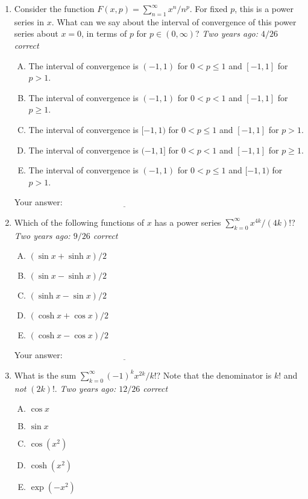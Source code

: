 \documentclass[10pt]{amsart}
\begin{document}
\begin{enumerate}
\item Consider the function $F(x,p) = \sum_{n=1}^\infty x^n/n^p$. For
  fixed $p$, this is a power series in $x$. What can we say about the
  interval of convergence of this power series about $x = 0$, in terms
  of $p$ for $p \in (0,\infty)$? {\em Two years ago: $4/26$ correct}
  \begin{enumerate}[(A)]
  \item The interval of convergence is $(-1,1)$ for $0 < p \le 1$ and
    $[-1,1]$ for $p > 1$.
  \item The interval of convergence is $(-1,1)$ for $0 < p < 1$ and
    $[-1,1]$ for $p \ge 1$.
  \item The interval of convergence is $[-1,1)$ for $0 < p \le 1$ and
    $[-1,1]$ for $p > 1$.
  \item The interval of convergence is $(-1,1]$ for $0 < p < 1$ and
    $[-1,1]$ for $p \ge 1$.
  \item The interval of convergence is $(-1,1)$ for $0 < p \le 1$ and
    $[-1,1)$ for $p > 1$.
  \end{enumerate}

  \vspace{0.05in}
  Your answer: $\underline{\qquad\qquad\qquad\qquad\qquad\qquad\qquad}$
  \vspace{0.05in}

\item Which of the following functions of $x$ has a power series
  $\sum_{k=0}^\infty x^{4k}/(4k)!$? {\em Two years ago: $9/26$ correct}
  \begin{enumerate}[(A)]
  \item $(\sin x + \sinh x)/2$
  \item $(\sin x - \sinh x)/2$
  \item $(\sinh x - \sin x)/2$
  \item $(\cosh x + \cos x)/2$
  \item $(\cosh x - \cos x)/2$
  \end{enumerate}

  \vspace{0.05in}
  Your answer: $\underline{\qquad\qquad\qquad\qquad\qquad\qquad\qquad}$
  \vspace{0.05in}

\item What is the sum $\sum_{k=0}^\infty (-1)^kx^{2k}/k!$? Note that
  the denominator is $k!$ and {\em not} $(2k)!$. {\em Two years ago:
  $12/26$ correct}

  \begin{enumerate}[(A)]
  \item $\cos x$
  \item $\sin x$
  \item $\cos(x^2)$
  \item $\cosh(x^2)$
  \item $\exp(-x^2)$
  \end{enumerate}


\end{enumerate}
\end{document}
